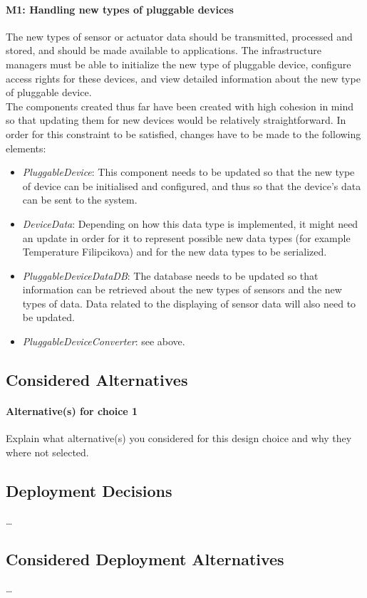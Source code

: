         \paragraph{M1: Handling new types of pluggable devices}
            The new types of sensor or actuator data should be transmitted,
            processed and stored, and should be made available to applications.
            The infrastructure managers must be able to initialize the new type
            of pluggable device, configure access rights for these devices, and
            view detailed information about the new type of pluggable device. \\
            The components created thus far have been created with high cohesion in
            mind so that updating them for new devices would be relatively straightforward.
            In order for this constraint to be satisfied, changes have to be made to
            the following elements:
            \begin{itemize}
                \item \emph{PluggableDevice}: This component needs to be updated
                      so that the new type of device can be initialised and configured,
                      and thus so that the device's data can be sent to the system.
                \item \emph{DeviceData}: Depending on how this data type
                      is implemented, it might need an update in order for it
                      to represent possible new data types (for example
                      Temperature Filipcikova) and for the new data types to be
                      serialized.
                \item \emph{PluggableDeviceDataDB}: The database needs to be updated
                      so that information can be retrieved about the new types
                      of sensors and the new types of data. Data related to the
                      displaying of sensor data will also need to be updated.
                \item \emph{PluggableDeviceConverter}: see above.
            \end{itemize}

    \subsection*{Considered Alternatives}
        \paragraph{Alternative(s) for choice 1} Explain what alternative(s) you
        considered for this design choice and why they where not selected.

    \subsection*{Deployment Decisions}
        \ldots

    \subsection*{Considered Deployment Alternatives}
        \ldots

